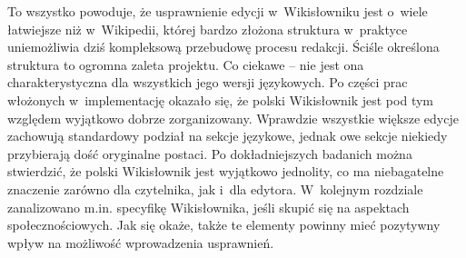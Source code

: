 To wszystko powoduje, że usprawnienie edycji w~Wikisłowniku jest o~wiele łatwiejsze niż w~Wikipedii, której bardzo złożona struktura w~praktyce uniemożliwia dziś kompleksową przebudowę procesu redakcji. Ściśle określona struktura to ogromna zaleta projektu. Co ciekawe -- nie jest ona charakterystyczna dla wszystkich jego wersji językowych. Po części prac włożonych w~implementację okazało się, że polski Wikisłownik jest pod tym względem wyjątkowo dobrze zorganizowany. Wprawdzie wszystkie większe edycje zachowują standardowy podział na sekcje językowe, jednak owe sekcje niekiedy przybierają dość oryginalne postaci. Po dokładniejszych badanich można stwierdzić, że polski Wikisłownik jest wyjątkowo jednolity, co ma niebagatelne znaczenie zarówno dla czytelnika, jak i~dla edytora. W~kolejnym rozdziale zanalizowano m.in. specyfikę Wikisłownika, jeśli skupić się na aspektach społecznościowych. Jak się okaże, także te elementy powinny mieć pozytywny wpływ na możliwość wprowadzenia usprawnień.
